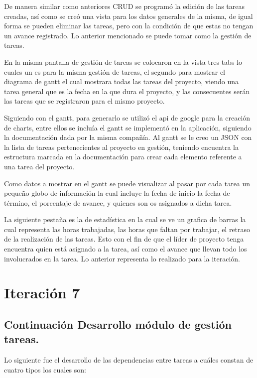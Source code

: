 De manera similar como anteriores CRUD se programó la edición de las tareas creadas, así como se creó una vista para los datos generales de la misma, de igual forma se pueden eliminar las tareas, pero con la condición de que estas no tengan un avance registrado. Lo anterior mencionado se puede tomar como la gestión de tareas. 

En la misma pantalla de gestión de tareas se colocaron en la vista tres tabs lo cuales un es para la misma gestión de tareas, el segundo para mostrar el diagrama de gantt el cual mostrara todas las tareas del proyecto, viendo una tarea general que es la fecha en la que dura el proyecto, y las consecuentes serán las tareas que se registraron para el mismo proyecto. 

Siguiendo con el gantt, para generarlo se utilizó el api de google para la creación de charts, entre ellos se incluía el gantt se implementó en la aplicación, siguiendo la documentación dada por la misma compañía. Al gantt se le creo un JSON con la lista de tareas pertenecientes al proyecto en gestión, teniendo encuentra la estructura marcada en la documentación para crear cada elemento referente a una tarea del proyecto. 

Como datos a mostrar en el gantt se puede visualizar al pasar por cada tarea un pequeño globo de información la cual incluye la fecha de inicio la fecha de término, el porcentaje de avance, y quienes son os asignados a dicha tarea. 

La siguiente pestaña es la de estadística en la cual se ve un grafica de barras la cual representa las horas trabajadas, las horas que faltan por trabajar, el retraso de la realización de las tareas. Esto con el fin de que el líder de proyecto tenga encuentra quien está asignado a la tarea, así como el avance que llevan todo los involucrados en la tarea. Lo anterior representa lo realizado para la iteración. 

\section{Iteración 7}
\subsection{Continuación Desarrollo módulo de gestión tareas.}

Lo siguiente fue el desarrollo de las dependencias entre tareas a cuáles constan de cuatro tipos los cuales son: 

